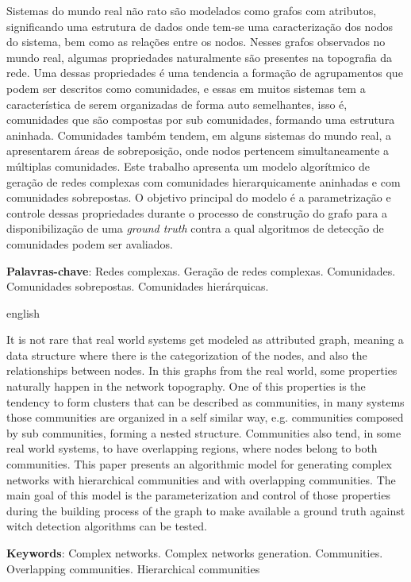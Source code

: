 \documentclass[notes.tex]{subfiles}
\begin{document}
\DoubleSpacing
\begin{resumoumacoluna}
\bigskip

Sistemas do mundo real não rato são modelados como grafos com atributos, significando uma estrutura de dados onde tem-se uma caracterização dos nodos do sistema, bem como as relações entre os nodos.
Nesses grafos observados no mundo real, algumas propriedades naturalmente são presentes na topografia da rede.
Uma dessas propriedades é uma tendencia a formação de agrupamentos que podem ser descritos como comunidades, e essas em muitos sistemas tem a característica de serem organizadas de forma auto semelhantes, isso é, comunidades que são compostas por sub comunidades, formando uma estrutura aninhada.
Comunidades também tendem, em alguns sistemas do mundo real, a apresentarem áreas de sobreposição, onde nodos pertencem simultaneamente a múltiplas comunidades.
Este trabalho apresenta um modelo algorítmico de geração de redes complexas com comunidades hierarquicamente aninhadas e com comunidades sobrepostas.
O objetivo principal do modelo é a parametrização e controle dessas propriedades durante o processo de construção do grafo para a disponibilização de uma \emph{ground truth} contra a qual algoritmos de detecção de comunidades podem ser avaliados.

 \vspace{\onelineskip}

 \noindent
 \textbf{Palavras-chave}: Redes complexas. Geração de redes complexas. Comunidades. Comunidades sobrepostas. Comunidades hierárquicas.
\end{resumoumacoluna}


\renewcommand{\resumoname}{Abstract}
\begin{resumoumacoluna}
 \begin{otherlanguage*}{english}
\bigskip

It is not rare that real world systems get modeled as attributed graph, meaning a data structure where there is the categorization of the nodes, and also the relationships between nodes.
In this graphs from the real world, some properties naturally happen in the network topography.
One of this properties is the tendency to form clusters that can be described as communities, in many systems those communities are organized in a self similar way, e.g. communities composed by sub communities, forming a nested structure.
Communities also tend, in some real world systems, to have overlapping regions, where nodes belong to both communities.
This paper presents an algorithmic model for generating complex networks with hierarchical communities and with overlapping communities.
The main goal of this model is the parameterization and control of those properties during the building process of the graph to make available a ground truth against witch detection algorithms can be tested.

   \vspace{\onelineskip}

   \noindent
   \textbf{Keywords}: Complex networks. Complex networks generation. Communities. Overlapping communities. Hierarchical communities
 \end{otherlanguage*}
\end{resumoumacoluna}
\end{document}
